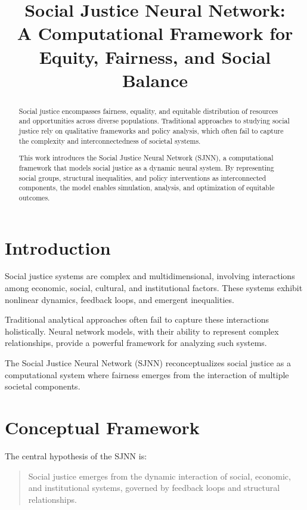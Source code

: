 \documentclass[12pt]{article}
\title{\textbf{Social Justice Neural Network: \\ A Computational Framework for Equity, Fairness, and Social Balance}}
\author{}
\date{}
\begin{document}
\maketitle

\begin{abstract}
Social justice encompasses fairness, equality, and equitable distribution of resources and opportunities across diverse populations. Traditional approaches to studying social justice rely on qualitative frameworks and policy analysis, which often fail to capture the complexity and interconnectedness of societal systems.

This work introduces the Social Justice Neural Network (SJNN), a computational framework that models social justice as a dynamic neural system. By representing social groups, structural inequalities, and policy interventions as interconnected components, the model enables simulation, analysis, and optimization of equitable outcomes.
\end{abstract}

\section{Introduction}

Social justice systems are complex and multidimensional, involving interactions among economic, social, cultural, and institutional factors. These systems exhibit nonlinear dynamics, feedback loops, and emergent inequalities.

Traditional analytical approaches often fail to capture these interactions holistically. Neural network models, with their ability to represent complex relationships, provide a powerful framework for analyzing such systems.

The Social Justice Neural Network (SJNN) reconceptualizes social justice as a computational system where fairness emerges from the interaction of multiple societal components.

\section{Conceptual Framework}

The central hypothesis of the SJNN is:

\begin{quote}
Social justice emerges from the dynamic interaction of social, economic, and institutional systems, governed by feedback loops and structural relationships.
\end{quote}
\end{document}
